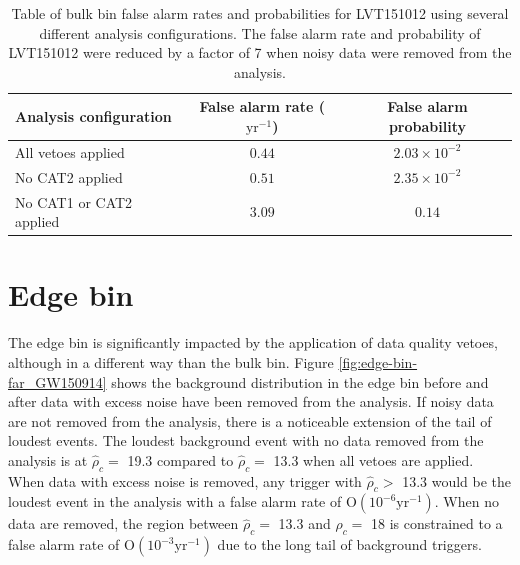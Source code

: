\begin{table}[!ht]%
  \begin{center}
    \begin{tabular}{lcc}
      \hline
      Analysis configuration & False alarm rate ($\mathrm{yr}^{-1}$) & False alarm probability \\ \hline
      All vetoes applied & $0.44$ & $2.03\times10^{-2}$ \\
      No CAT2 applied & $0.51$ & $2.35\times10^{-2}$ \\
      No CAT1 or CAT2 applied & $3.09$ & $0.14$ \\
      \hline
    \end{tabular}
  \end{center}
  \caption[LVT150914 FAR]{Table of bulk bin false alarm rates and probabilities for LVT151012 using several %
           different analysis %
           configurations. The false alarm rate and probability of LVT151012 were reduced by a %
           factor of 7 when noisy data were removed from the analysis.}
  \label{table:151012-far}
\end{table}

\section{Edge bin}\label{sec:edge-bin}

The edge bin is significantly impacted by the application of data quality vetoes, although in a
different way than the bulk bin. Figure \ref{fig:edge-bin-far_GW150914} shows the background
distribution in the edge bin before and after data with excess noise have been removed from the analysis.
If noisy data are not removed from the analysis, there is
a noticeable extension of the tail of loudest events. The loudest background event with no data
removed from the analysis is at $\hat{\rho}_{c} =$ 19.3 compared to $\hat{\rho}_{c} =$ 13.3
when all vetoes are applied.
When data with excess noise is removed, any trigger with $\hat{\rho}_{c} >$ 13.3 would be the loudest event in
the analysis
with a false alarm rate of O$(10^{-6} \mathrm{yr}^{-1})$. When no data are removed, the region between
$\hat{\rho}_{c} =$ 13.3 and
$\hat{\rho}_{c} =$ 18 is constrained to a false alarm rate of O$(10^{-3} \mathrm{yr}^{-1})$ due to the long
tail of background triggers.

